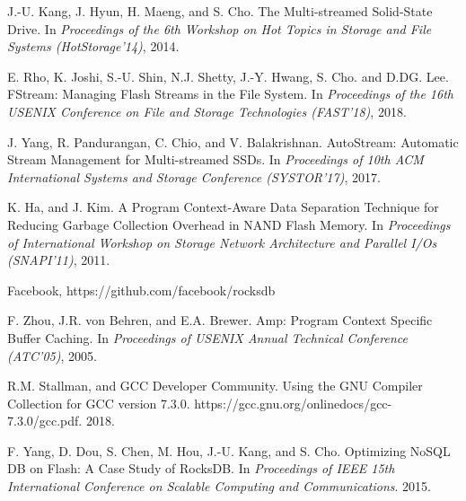 

\begin{thebibliography}{00}

J.-U. Kang, J. Hyun, H. Maeng, and S. Cho. The Multi-streamed Solid-State Drive.
In \textit{Proceedings of the 6th Workshop on Hot Topics in Storage and File Systems (HotStorage'14)}, 2014.

E. Rho, K. Joshi, S.-U. Shin, N.J. Shetty, J.-Y. Hwang, S. Cho. and D.DG. Lee. 
FStream: Managing Flash Streams in the File System.
In \textit{Proceedings of the 16th USENIX Conference on File and Storage Technologies (FAST'18)}, 2018.

J. Yang, R. Pandurangan, C. Chio, and V. Balakrishnan.
AutoStream: Automatic Stream Management for Multi-streamed SSDs.
In \textit{Proceedings of 10th ACM International Systems and Storage Conference (SYSTOR'17)}, 2017.

K. Ha, and J. Kim.
A Program Context-Aware Data Separation Technique for Reducing Garbage Collection Overhead in NAND Flash Memory.
In \textit{Proceedings of International Workshop on Storage Network Architecture 
and Parallel I/Os (SNAPI'11)}, 2011.

Facebook, https://github.com/facebook/rocksdb

F. Zhou, J.R. von Behren, and E.A. Brewer.
Amp: Program Context Specific Buffer Caching.
In \textit{Proceedings of USENIX Annual Technical Conference (ATC'05)}, 2005.

R.M. Stallman, and GCC Developer Community.
Using the GNU Compiler Collection for GCC version 7.3.0.
https://gcc.gnu.org/onlinedocs/gcc-7.3.0/gcc.pdf. 2018.

F. Yang, D. Dou, S. Chen, M. Hou, J.-U. Kang, and S. Cho.
Optimizing NoSQL DB on Flash: A Case Study of RocksDB.
In \textit{Proceedings of IEEE 15th International Conference on Scalable Computing
and Communications}. 2015.
\end{thebibliography}
